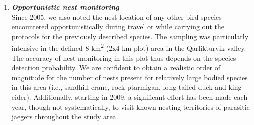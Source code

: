\documentclass[a4paper,twoside,10pt]{article}
\begin{document}
\begin{enumerate}[label=\roman*]
	\item[] \textit{\textbf{Opportunistic nest monitoring}}\\
	Since 2005, we also noted the nest location of any other bird species encountered opportunistically during travel or while carrying out the protocols for the previously described species. The sampling was particularly intensive in the defined 8 km\textsuperscript{2} (2x4 km plot) area in the Qarlikturvik valley. The accuracy of nest monitoring in this plot thus depends on the species detection probability. We are confident to obtain a realistic order of magnitude for the number of nests present for relatively large bodied species in this area (i.e., sandhill crane, rock ptarmigan, long-tailed duck and king eider). Additionally, starting in 2009, a significant effort has been made each year, though not systematically, to visit known nesting territories of parasitic jaegers throughout the study area.
	\end{enumerate}


\newpage
\end{document}
